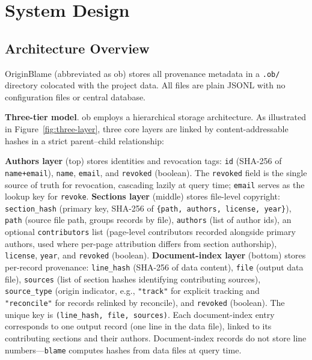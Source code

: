 \section{System Design}

\subsection{Architecture Overview}

OriginBlame (abbreviated as ob) stores all provenance metadata in a \texttt{.ob/} directory colocated with the project data. All files are plain JSONL with no configuration files or central database.

\textbf{Three-tier model}. ob employs a hierarchical storage architecture. As illustrated in Figure~\ref{fig:three-layer}, three core layers are linked by content-addressable hashes in a strict parent--child relationship:

\textbf{Authors layer} (top) stores identities and revocation tags: \texttt{id} (SHA-256 of \texttt{name+email}), \texttt{name}, \texttt{email}, and \texttt{revoked} (boolean). The \texttt{revoked} field is the single source of truth for revocation, cascading lazily at query time; \texttt{email} serves as the lookup key for \texttt{revoke}. \textbf{Sections layer} (middle) stores file-level copyright: \texttt{section\_hash} (primary key, SHA-256 of \texttt{\{path, authors, license, year\}}), \texttt{path} (source file path, groups records by file), \texttt{authors} (list of author ids), an optional \texttt{contributors} list (page-level contributors recorded alongside primary authors, used where per-page attribution differs from section authorship), \texttt{license}, \texttt{year}, and \texttt{revoked} (boolean). \textbf{Document-index layer} (bottom) stores per-record provenance: \texttt{line\_hash} (SHA-256 of data content), \texttt{file} (output data file), \texttt{sources} (list of section hashes identifying contributing sources), \texttt{source\_type} (origin indicator, e.g., \texttt{"track"} for explicit tracking and \texttt{"reconcile"} for records relinked by reconcile), and \texttt{revoked} (boolean). The unique key is \texttt{(line\_hash, file, sources)}. Each document-index entry corresponds to one output record (one line in the data file), linked to its contributing sections and their authors. Document-index records do not store line numbers---\texttt{blame} computes hashes from data files at query time.

